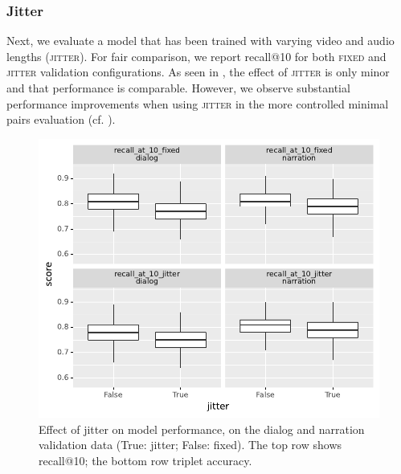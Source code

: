 \subsubsection{Jitter}
Next, we evaluate a model that has been trained with varying video and audio 
lengths (\textsc{jitter}). For fair comparison, we report recall@10 for both 
\textsc{fixed} and \textsc{jitter} validation configurations.
As seen in , the effect of \textsc{jitter} is only
minor and that performance is comparable.%
However, we observe 
substantial performance improvements when using \textsc{jitter} in the more 
controlled minimal pairs evaluation (cf. ).
\begin{figure}[htb]
	\centering
	\includegraphics[width=\columnwidth]{results/ablations/jitter.pdf}
	\caption{Effect of jitter on model performance, on the dialog
          and narration validation data (True: jitter; False:
          fixed). The top row shows recall@10; the bottom row triplet
          accuracy.}
	\label{fig:jitter}
\end{figure}



